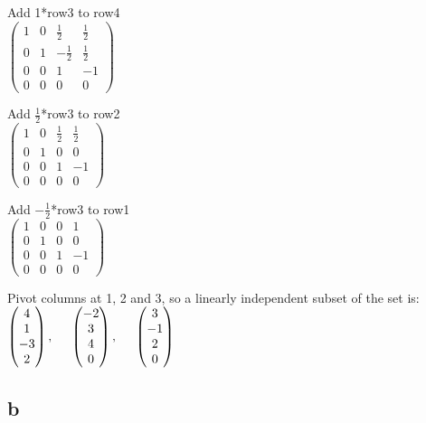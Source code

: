 \documentclass{article}
\begin{document}
Add 1*row3 to row4\\
$
\left (
    \begin{matrix}
        1 & 0 & \frac{1}{2} & \frac{1}{2}\\
        0 & 1 & -\frac{1}{2} & \frac{1}{2}\\
        0 & 0 & 1 & -1\\
        0 & 0 & 0 & 0
    \end{matrix}
\right )
$

Add $\frac{1}{2}$*row3 to row2\\
$
\left (
    \begin{matrix}
        1 & 0 & \frac{1}{2} & \frac{1}{2}\\
        0 & 1 & 0 & 0\\
        0 & 0 & 1 & -1\\
        0 & 0 & 0 & 0
    \end{matrix}
\right )
$

Add $-\frac{1}{2}$*row3 to row1\\
$
\left (
    \begin{matrix}
        1 & 0 & 0 & 1\\
        0 & 1 & 0 & 0\\
        0 & 0 & 1 & -1\\
        0 & 0 & 0 & 0
    \end{matrix}
\right )
$

Pivot columns at 1, 2 and 3, so a linearly independent subset of the set is:
$
\left (
    \begin{matrix}
        4\\
        1\\
        -3\\
        2
    \end{matrix}
\right )
, \hspace{5 mm}
\left (
    \begin{matrix}
        -2\\
        3\\
        4\\
        0
    \end{matrix}
\right )
, \hspace{5 mm}
\left (
    \begin{matrix}
        3\\
        -1\\
        2\\
        0
    \end{matrix}
\right )
$

\subsection*{b}
\end{document}
